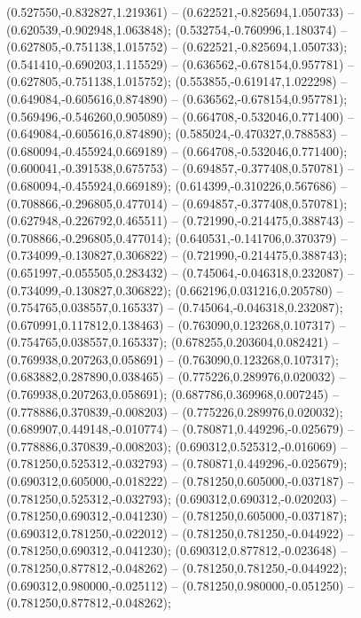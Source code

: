  (0.527550,-0.832827,1.219361) -- (0.622521,-0.825694,1.050733) -- (0.620539,-0.902948,1.063848);
 (0.532754,-0.760996,1.180374) -- (0.627805,-0.751138,1.015752) -- (0.622521,-0.825694,1.050733);
 (0.541410,-0.690203,1.115529) -- (0.636562,-0.678154,0.957781) -- (0.627805,-0.751138,1.015752);
 (0.553855,-0.619147,1.022298) -- (0.649084,-0.605616,0.874890) -- (0.636562,-0.678154,0.957781);
 (0.569496,-0.546260,0.905089) -- (0.664708,-0.532046,0.771400) -- (0.649084,-0.605616,0.874890);
 (0.585024,-0.470327,0.788583) -- (0.680094,-0.455924,0.669189) -- (0.664708,-0.532046,0.771400);
 (0.600041,-0.391538,0.675753) -- (0.694857,-0.377408,0.570781) -- (0.680094,-0.455924,0.669189);
 (0.614399,-0.310226,0.567686) -- (0.708866,-0.296805,0.477014) -- (0.694857,-0.377408,0.570781);
 (0.627948,-0.226792,0.465511) -- (0.721990,-0.214475,0.388743) -- (0.708866,-0.296805,0.477014);
 (0.640531,-0.141706,0.370379) -- (0.734099,-0.130827,0.306822) -- (0.721990,-0.214475,0.388743);
 (0.651997,-0.055505,0.283432) -- (0.745064,-0.046318,0.232087) -- (0.734099,-0.130827,0.306822);
 (0.662196,0.031216,0.205780) -- (0.754765,0.038557,0.165337) -- (0.745064,-0.046318,0.232087);
 (0.670991,0.117812,0.138463) -- (0.763090,0.123268,0.107317) -- (0.754765,0.038557,0.165337);
 (0.678255,0.203604,0.082421) -- (0.769938,0.207263,0.058691) -- (0.763090,0.123268,0.107317);
 (0.683882,0.287890,0.038465) -- (0.775226,0.289976,0.020032) -- (0.769938,0.207263,0.058691);
 (0.687786,0.369968,0.007245) -- (0.778886,0.370839,-0.008203) -- (0.775226,0.289976,0.020032);
 (0.689907,0.449148,-0.010774) -- (0.780871,0.449296,-0.025679) -- (0.778886,0.370839,-0.008203);
 (0.690312,0.525312,-0.016069) -- (0.781250,0.525312,-0.032793) -- (0.780871,0.449296,-0.025679);
 (0.690312,0.605000,-0.018222) -- (0.781250,0.605000,-0.037187) -- (0.781250,0.525312,-0.032793);
 (0.690312,0.690312,-0.020203) -- (0.781250,0.690312,-0.041230) -- (0.781250,0.605000,-0.037187);
 (0.690312,0.781250,-0.022012) -- (0.781250,0.781250,-0.044922) -- (0.781250,0.690312,-0.041230);
 (0.690312,0.877812,-0.023648) -- (0.781250,0.877812,-0.048262) -- (0.781250,0.781250,-0.044922);
 (0.690312,0.980000,-0.025112) -- (0.781250,0.980000,-0.051250) -- (0.781250,0.877812,-0.048262);
